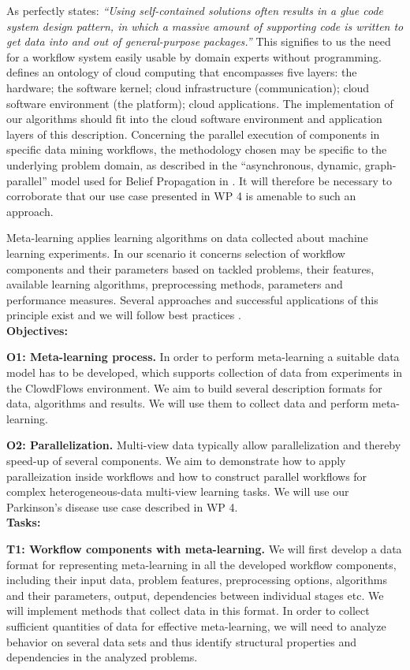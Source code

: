 \documentclass[a4paper,11pt]{article}
\begin{document}
As \citep{MLTechnicalDebt} perfectly states: \textit{``Using self-contained solutions often results in a glue code system design pattern, in which a massive amount of supporting code is written to get data into and out of general-purpose packages.'' } This signifies to us the need for a workflow system easily usable by domain experts without programming. \citet{Youseff2008} defines an ontology of cloud computing that encompasses five layers: the hardware; the software kernel; cloud infrastructure (communication); cloud software environment (the platform); cloud applications. The implementation of our algorithms should fit into the cloud software environment and application layers of  this description. Concerning the parallel execution of components in specific data mining workflows, the methodology chosen may be specific to the underlying problem domain, as described in the ``asynchronous, dynamic, graph-parallel'' model used for Belief Propagation in \citep{Low2012}. It will therefore be necessary to corroborate that our use case presented in WP 4 is amenable to such an approach. 

Meta-learning applies learning algorithms on data collected about machine learning experiments. In our scenario it concerns selection of workflow components and their parameters based on tackled problems, their features, available learning algorithms, preprocessing methods, parameters and performance measures. Several approaches and successful applications of this principle exist and we will follow best practices \citep{Lemke2015}.
%
%
\\[0,2cm]
\textbf{Objectives:}

\textbf{O1: Meta-learning process.} In order to perform meta-learning a suitable data model has to be developed, which supports collection of data from experiments in the ClowdFlows environment. We aim to build several description formats for data, algorithms and results. We will use them to collect data and perform meta-learning.

\textbf{O2: Parallelization.} Multi-view data typically allow  parallelization and thereby speed-up of several components. We aim to demonstrate how to apply paralleization inside workflows and how to construct parallel workflows for complex heterogeneous-data multi-view learning tasks. We will use our Parkinson's disease use case described in WP 4.   
\\[0,2cm]
\textbf{Tasks:}

\textbf{T1: Workflow components with meta-learning.} We will first develop a data format for representing meta-learning in all the developed workflow components, including their input data, problem features, preprocessing options, algorithms and their parameters, output, dependencies between individual stages etc. We will implement methods that collect data in this format. In order to collect sufficient quantities of data for effective meta-learning, we will need to analyze  behavior on several data sets and thus identify structural properties and dependencies in the analyzed problems.
\end{document}
